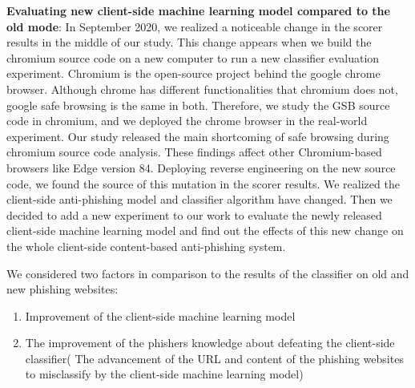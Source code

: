 \documentclass[letterpaper,twocolumn,10pt]{article}
\begin{document}
\textbf{Evaluating new client-side machine learning model compared to the old mode}:
In September 2020, we realized a noticeable change in the scorer results in the middle of our study. This change appears when we build the chromium source code on a new computer to run a new classifier evaluation experiment.
Chromium is the open-source project behind the google chrome browser. Although chrome has different functionalities that chromium does not, google safe browsing is the same in both. Therefore, we study the GSB source code in chromium, and we deployed the chrome browser in the real-world experiment. Our study released the main shortcoming of safe browsing during chromium source code analysis. These findings affect other Chromium-based browsers like  Edge version 84.
Deploying reverse engineering on the new source code, we found the source of this mutation in the scorer results. We realized the client-side anti-phishing model and classifier algorithm have changed. Then we decided to add a new experiment to our work to evaluate the newly released client-side machine learning model and find out the effects of this new change on the whole client-side content-based anti-phishing system. 

We considered two factors in comparison to the results of the classifier on old and new phishing websites:
\begin{enumerate}[label=(\alph*)]
    \item Improvement of the client-side machine learning model
    \item The improvement of the phishers knowledge about defeating the client-side classifier( The advancement of the URL and content of the phishing websites to misclassify by the client-side machine learning model)
\end{enumerate}
\end{document}

